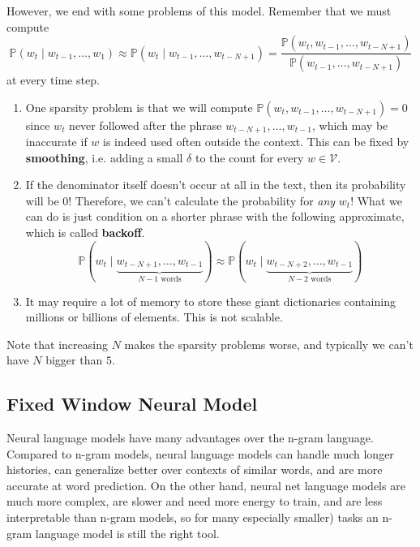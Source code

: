 \documentclass{article}
\begin{document}
    However, we end with some problems of this model. Remember that we must compute 
    \begin{equation}
      \mathbb{P}(w_t \mid w_{t-1}, \ldots, w_{1}) \approx \mathbb{P}( w_t \mid w_{t-1}, \ldots, w_{t - N + 1}) = \frac{\mathbb{P}(w_t, w_{t-1}, \ldots, w_{t-N+1})}{\mathbb{P}(w_{t-1}, \ldots, w_{t-N+1})}
    \end{equation}
    at every time step.
    \begin{enumerate}
        \item One sparsity problem is that we will compute $\mathbb{P}(w_t, w_{t-1}, \ldots, w_{t-N+1}) = 0$ since $w_t$ never followed after the phrase $w_{t-N+1}, \ldots, w_{t-1}$, which may be inaccurate if $w$ is indeed used often outside the context. This can be fixed by \textbf{smoothing}, i.e. adding a small $\delta$ to the count for every $w \in \mathcal{V}$. 
        
        \item If the denominator itself doesn't occur at all in the text, then its probability will be $0$! Therefore, we can't calculate the probability for \textit{any} $w_t$! What we can do is just condition on a shorter phrase with the following approximate, which is called \textbf{backoff}. 
        \begin{equation}
          \mathbb{P}( w_t \mid \underbrace{w_{t - N + 1}, \ldots, w_{t-1}}_{N-1 \text{ words}}) \approx \mathbb{P}( w_t \mid \underbrace{w_{t - N + 2}, \ldots, w_{t-1}}_{N-2 \text{ words}})
        \end{equation}

        \item It may require a lot of memory to store these giant dictionaries containing millions or billions of elements. This is not scalable. 
    \end{enumerate}
    Note that increasing $N$ makes the sparsity problems worse, and typically we can't have $N$ bigger than $5$. 

  \subsection{Fixed Window Neural Model}

    Neural language models have many advantages over the n-gram language. Compared to n-gram models, neural language models can handle much longer histories, can generalize better over contexts of similar words, and are more accurate at word prediction. On the other hand, neural net language models are much more complex, are slower and need more energy to train, and are less interpretable than n-gram models, so for many 
    especially smaller) tasks an n-gram language model is still the right tool. 
\end{document}
